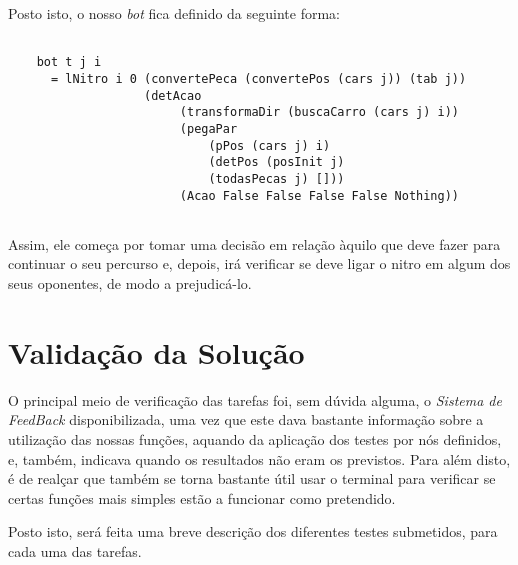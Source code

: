 \documentclass[a4paper]{report} %
\begin{document}
  \par \noindent Posto isto, o nosso \textit{bot} fica definido da seguinte forma:
  
  \begin{verbatim}
      
    bot t j i
      = lNitro i 0 (convertePeca (convertePos (cars j)) (tab j))
                   (detAcao 
                        (transformaDir (buscaCarro (cars j) i))
                        (pegaPar 
                            (pPos (cars j) i) 
                            (detPos (posInit j) 
                            (todasPecas j) []))
                        (Acao False False False False Nothing))  
      
  \end{verbatim}
  
  \par \noindent Assim, ele começa por tomar uma decisão em relação àquilo que deve fazer para continuar o seu percurso e, depois, irá verificar se deve ligar o nitro em algum dos seus oponentes, de modo a prejudicá-lo.





\chapter{Validação da Solução}

\par \noindent O principal meio de verificação das tarefas foi, sem dúvida alguma, o \textit{Sistema de FeedBack} disponibilizada, uma vez que este dava bastante informação sobre a utilização das nossas funções, aquando da aplicação dos testes por nós definidos, e, também, indicava quando os resultados não eram os previstos. Para além disto, é de realçar que também se torna bastante útil usar o terminal para verificar se certas funções mais simples estão a funcionar como pretendido.

\par \noindent Posto isto, será feita uma breve descrição dos diferentes testes submetidos, para cada uma das tarefas.
\end{document}
